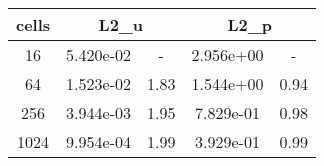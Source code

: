 \documentclass[10pt]{report}
\begin{document}
\begin{table}[H]
\begin{center}
\begin{tabular}{|c|c|c|c|c|} \hline
cells & 
\multicolumn{2}{|c|}{L2_u} & 
\multicolumn{2}{|c|}{L2_p}\\ \hline
16 & 5.420e-02 & - & 2.956e+00 & -\\ \hline
64 & 1.523e-02 & 1.83 & 1.544e+00 & 0.94\\ \hline
256 & 3.944e-03 & 1.95 & 7.829e-01 & 0.98\\ \hline
1024 & 9.954e-04 & 1.99 & 3.929e-01 & 0.99\\ \hline
\end{tabular}
\end{center}
\end{table}
\end{document}
